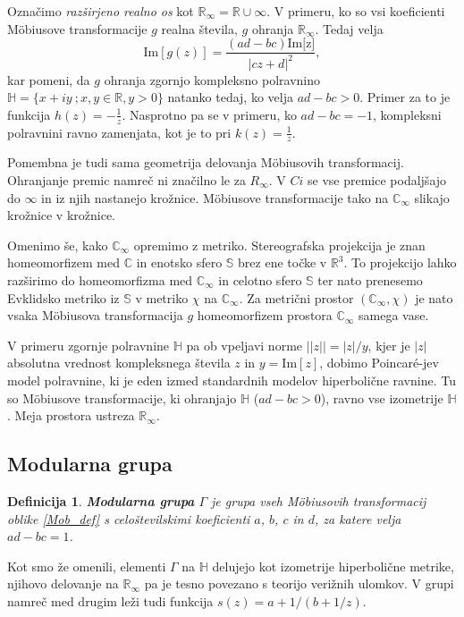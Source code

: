 \documentclass[a4paper,12pt]{article}
\def\R{\mathbb{R}} %
\def\C{\mathbb{C}} %
\def\Ci{\mathbb{C}_{\infty}} %
\def\H{\mathbb{H}} %
\newtheorem{definicija}{Definicija}
\begin{document}
Označimo \emph{razširjeno realno os} kot $\R_{\infty} = \R \cup \infty$. V primeru, ko so vsi koeficienti M\"obiusove transformacije $g$ realna števila, $g$ ohranja $\R_{\infty}$. Tedaj velja
\[
    \text{Im}[g(z)] = \frac{(ad - bc)\text{Im[z]}}{|cz + d|^2},
\]
kar pomeni, da $g$ ohranja zgornjo kompleksno polravnino $\H = \{x + iy\ ; x, y \in \R, y > 0\}$ natanko tedaj, ko velja $ad - bc > 0$. Primer za to je funkcija $h(z) = - \frac{1}{z}$. Nasprotno pa se v primeru, ko $ad - bc = -1$, kompleksni polravnini ravno zamenjata, kot je to pri $k(z) = \frac{1}{z}$.

Pomembna je tudi sama geometrija delovanja M\"obiusovih transformacij. Ohranjanje premic namreč ni značilno le za $R_\infty$. V $Ci$ se vse premice podaljšajo do $\infty$ in iz njih nastanejo krožnice. M\"obiusove transformacije tako na $\Ci$ slikajo krožnice v krožnice.

Omenimo še, kako $\Ci$ opremimo z metriko. Stereografska projekcija je znan 
homeomorfizem med $\C$ in enotsko sfero $\mathbb{S}$ brez ene točke v $\R^3$. To projekcijo lahko razširimo do homeomorfizma med $\Ci$ in celotno sfero $\mathbb{S}$ ter nato prenesemo Evklidsko metriko iz $\mathbb{S}$ v metriko $\chi$ na $\Ci$. Za metrični prostor $(\Ci, \chi)$ je nato vsaka M\"obiusova transformacija $g$ homeomorfizem prostora $\Ci$ samega vase.

V primeru zgornje polravnine $\H$ pa ob vpeljavi norme $||z|| = |z| / y$, kjer je $|z|$ absolutna vrednost kompleksnega števila $z$ in $y = \text{Im}[z]$, dobimo Poincar\'{e}-jev model polravnine, ki je eden izmed standardnih modelov hiperbolične ravnine. Tu so M\"obiusove transformacije, ki ohranjajo $\H$ ($ad - bc > 0$), ravno vse izometrije $\H$. Meja prostora ustreza $\R_{\infty}.$ 


\subsection{Modularna grupa}

\begin{definicija}
    \textbf{Modularna grupa} $\Gamma$ je grupa vseh M\"obiusovih transformacij oblike \eqref{Mob_def} s celoštevilskimi koeficienti $a$, $b$, $c$ in $d$, za katere velja $ad - bc = 1$.
\end{definicija}

Kot smo že omenili, elementi $\Gamma$ na $\H$ delujejo kot izometrije hiperbolične metrike, njihovo delovanje na $\R_{\infty}$ pa je tesno povezano s teorijo verižnih ulomkov. V grupi namreč med drugim leži tudi funkcija $s(z) = a + 1/(b + 1/z)$.
\end{document}
